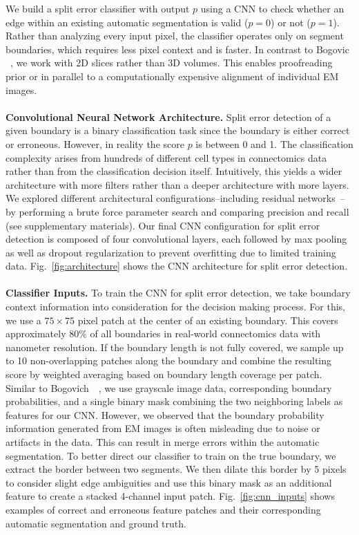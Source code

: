 We build a split error classifier with output $p$ using a CNN to check whether an edge within an existing automatic segmentation is valid ($p=0$) or not ($p=1$). Rather than analyzing every input pixel, the classifier operates only on segment boundaries, which requires less pixel context and is faster. In contrast to Bogovic \etal~\cite{BogovicHJ13}, we work with 2D slices rather than 3D volumes. This enables proofreading prior or in parallel to a computationally expensive alignment of individual EM images.
\\~\\
\textbf{Convolutional Neural Network Architecture.} Split error detection of a given boundary is a binary classification task since the boundary is either correct or erroneous. However, in reality the score $p$ is between 0 and 1. The classification complexity arises from hundreds of different cell types in connectomics data rather than from the classification decision itself. Intuitively, this yields a wider architecture with more filters rather than a deeper architecture with more layers. We explored different architectural configurations--including residual networks~\cite{resnet}--by performing a brute force parameter search and comparing precision and recall (see supplementary materials). Our final CNN configuration for split error detection is composed of four convolutional layers, each followed by max pooling as well as dropout regularization to prevent overfitting due to limited training data. Fig.~\ref{fig:architecture} shows the CNN architecture for split error detection.
\\~\\
\textbf{Classifier Inputs.} To train the CNN for split error detection, we take boundary context information into consideration for the decision making process. For this, we use a $75\times75$ pixel patch at the center of an existing boundary. This covers approximately $80\%$ of all boundaries in real-world connectomics data with nanometer resolution. If the boundary length is not fully covered, we sample up to 10 non-overlapping patches along the boundary and combine the resulting score by weighted averaging based on boundary length coverage per patch.
%
Similar to Bogovich~\etal~\cite{BogovicHJ13}, we use grayscale image data,
corresponding boundary probabilities, and a single binary mask combining the two
neighboring labels as features for our CNN. However, we observed that the
boundary probability information generated from EM images is often misleading
due to noise or artifacts in the data. This can result in merge errors within
the automatic segmentation. To better direct our classifier to train on the true
boundary, we extract the border between two segments. We then dilate this border
by 5 pixels to consider slight edge ambiguities and use this binary mask as an
additional feature to create a stacked 4-channel input patch.
Fig.~\ref{fig:cnn_inputs} shows examples of correct and erroneous feature
patches and their corresponding automatic segmentation and ground truth.

